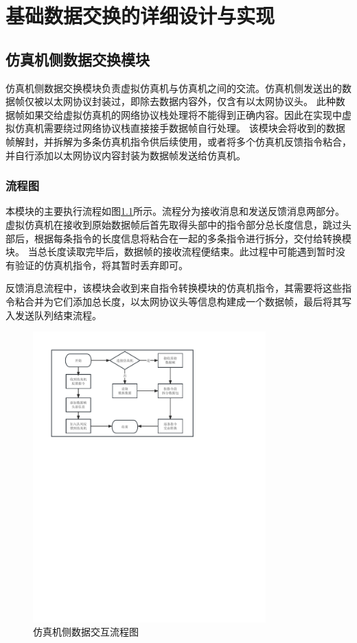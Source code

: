 \chapter{基础数据交换的详细设计与实现}
\section{仿真机侧数据交换模块}
仿真机侧数据交换模块负责虚拟仿真机与仿真机之间的交流。仿真机侧发送出的数据帧仅被以太网协议封装过，即除去数据内容外，仅含有以太网协议头。
此种数据帧如果交给虚拟仿真机的网络协议栈处理将不能得到正确内容。因此在实现中虚拟仿真机需要绕过网络协议栈直接接手数据帧自行处理。
该模块会将收到的数据帧解封，并拆解为多条仿真机指令供后续使用，或者将多个仿真机反馈指令粘合，并自行添加以太网协议内容封装为数据帧发送给仿真机。
\subsection{流程图}
\par
本模块的主要执行流程如图\ref{module11}所示。流程分为接收消息和发送反馈消息两部分。虚拟仿真机在接收到原始数据帧后首先取得头部中的指令部分总长度信息，跳过头部后，根据每条指令的长度信息将粘合在一起的多条指令进行拆分，交付给转换模块。
当总长度读取完毕后，数据帧的接收流程便结束。此过程中可能遇到暂时没有验证的仿真机指令，将其暂时丢弃即可。
\par
反馈消息流程中，该模块会收到来自指令转换模块的仿真机指令，其需要将这些指令粘合并为它们添加总长度，以太网协议头等信息构建成一个数据帧，最后将其写入发送队列结束流程。
\clearpage
\begin{figure}[h!]
    \begin{center}
        \includegraphics[width=0.8\textwidth]{pictures/flowchart1.pdf}
        \caption{仿真机侧数据交互流程图}
        \label{module11}
    \end{center}
\end{figure}
